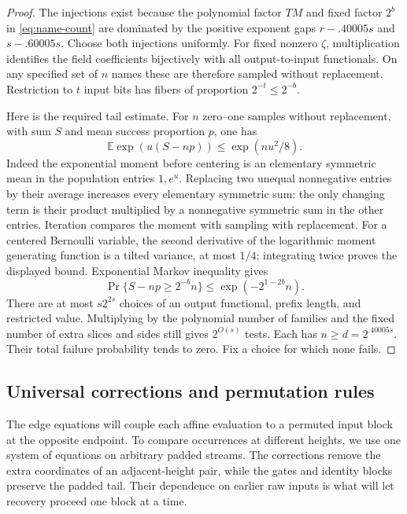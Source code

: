 \begin{proof}
The injections exist because the polynomial factor $TM$ and fixed factor
$2^b$ in \eqref{eq:name-count} are dominated by the positive exponent
gaps $r-.40005s$ and $s-.60005s$.  Choose both injections uniformly.
For fixed nonzero $\zeta$, multiplication identifies the field
coefficients bijectively with all output-to-input functionals.  On any
specified set of $n$ names these are therefore sampled without
replacement.  Restriction to $t$ input bits has fibers of proportion
$2^{-t}\le2^{-b}$.

Here is the required tail estimate.  For $n$ zero--one samples without
replacement, with sum $S$ and mean success proportion $p$, one has
\[
 \mathbb E\exp(u(S-np))\le\exp(nu^2/8).
\]
Indeed the exponential moment before centering is an elementary
symmetric mean in the population entries $1,e^u$.  Replacing two unequal
nonnegative entries by their average increases every elementary
symmetric sum: the only changing term is their product multiplied by
a nonnegative symmetric sum in the other entries.  Iteration compares
the moment with sampling with replacement.  For a centered Bernoulli
variable, the second derivative of the logarithmic moment generating
function is a tilted variance, at most $1/4$; integrating twice proves
the displayed bound.  Exponential Markov inequality gives
\[
 \Pr\{S-np\ge 2^{-b}n\}\le
 \exp(-2^{1-2b}n).
\]
There are at most $s2^{2s}$ choices of an output functional, prefix length,
and restricted value.  Multiplying by the polynomial number of families
and the fixed number of extra slices and sides still gives $2^{O(s)}$
tests.  Each has $n\ge d=2^{.40005s}$.  Their total failure probability
tends to zero.  Fix a choice for which none fails.
\end{proof}

\subsection{Universal corrections and permutation rules}

The edge equations will couple each affine evaluation to a permuted
input block at the opposite endpoint.  To compare occurrences at different
heights, we use one system of equations on arbitrary padded streams.
The corrections remove the extra coordinates of an adjacent-height pair,
while the gates and identity blocks preserve the padded tail.  Their
dependence on earlier raw inputs is what will let recovery proceed one
block at a time.

